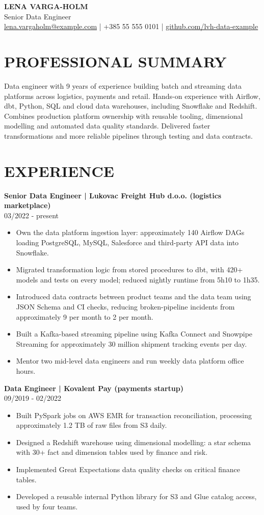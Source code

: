 \documentclass[11pt,a4paper]{article}
\newcommand{\cvsection}[1]{\section*{#1}}
\newcommand{\cvrole}[2]{\par\addvspace{0.5em}\noindent\textbf{#1}\\#2\par\nopagebreak}
\begin{document}
{\LARGE\bfseries\color{primarycolor} LENA VARGA-HOLM}\\[0.3em]
{\large\color{accentcolor} Senior Data Engineer}\\[0.3em]
{\small\href{mailto:lena.vargaholm@example.com}{lena.vargaholm@example.com} | +385 55 555 0101 | \href{https://github.com/lvh-data-example}{github.com/lvh-data-example}}

\cvsection{PROFESSIONAL SUMMARY}
Data engineer with 9 years of experience building batch and streaming data platforms across logistics, payments and retail. Hands-on experience with Airflow, dbt, Python, SQL and cloud data warehouses, including Snowflake and Redshift. Combines production platform ownership with reusable tooling, dimensional modelling and automated data quality standards. Delivered faster transformations and more reliable pipelines through testing and data contracts.

\cvsection{EXPERIENCE}
\cvrole{Senior Data Engineer | Lukovac Freight Hub d.o.o. (logistics marketplace)}{03/2022 - present}
\begin{itemize}
\item Own the data platform ingestion layer: approximately 140 Airflow DAGs loading PostgreSQL, MySQL, Salesforce and third-party API data into Snowflake.
\item Migrated transformation logic from stored procedures to dbt, with 420+ models and tests on every model; reduced nightly runtime from 5h10 to 1h35.
\item Introduced data contracts between product teams and the data team using JSON Schema and CI checks, reducing broken-pipeline incidents from approximately 9 per month to 2 per month.
\item Built a Kafka-based streaming pipeline using Kafka Connect and Snowpipe Streaming for approximately 30 million shipment tracking events per day.
\item Mentor two mid-level data engineers and run weekly data platform office hours.
\end{itemize}

\cvrole{Data Engineer | Kovalent Pay (payments startup)}{09/2019 - 02/2022}
\begin{itemize}
\item Built PySpark jobs on AWS EMR for transaction reconciliation, processing approximately 1.2 TB of raw files from S3 daily.
\item Designed a Redshift warehouse using dimensional modelling: a star schema with 30+ fact and dimension tables used by finance and risk.
\item Implemented Great Expectations data quality checks on critical finance tables.
\item Developed a reusable internal Python library for S3 and Glue catalog access, used by four teams.
\end{itemize}
\end{document}
